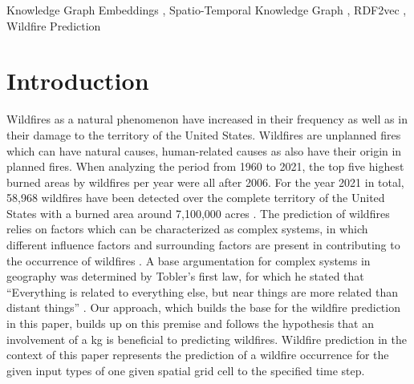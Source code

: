 \documentclass[
]{ceurart}
\begin{document}
\begin{keywords}
	Knowledge Graph Embeddings \sep
	Spatio-Temporal Knowledge Graph \sep
	RDF2vec \sep
	Wildfire Prediction
\end{keywords}

\maketitle

\section{Introduction}
Wildfires as a natural phenomenon have increased in their frequency as well as in their damage to the territory of the United States. Wildfires are unplanned fires which can have natural causes, human-related causes as also have their origin in planned fires. When analyzing the period from 1960 to 2021, the top five highest burned areas by wildfires per year were all after 2006. For the year 2021 in total, 58,968 wildfires have been detected over the complete territory of the United States with a burned area around 7,100,000 acres \cite{Hoover.2021}. The prediction of wildfires relies on factors which can be characterized as complex systems, in which different influence factors and surrounding factors are present in contributing to the occurrence of wildfires \cite{Pastor.2003}. A base argumentation for complex systems in geography was determined by Tobler's first law, for which he stated that “Everything is related to everything else, but near things are more related than distant things” \cite{Tobler.1970}. Our approach, which builds the base for the wildfire prediction in this paper, builds up on this premise and follows the hypothesis that an involvement of a \gls*{kg} is beneficial to predicting wildfires. Wildfire prediction in the context of this paper represents the prediction of a wildfire occurrence for the given input types of one given spatial grid cell to the specified time step.
\end{document}
